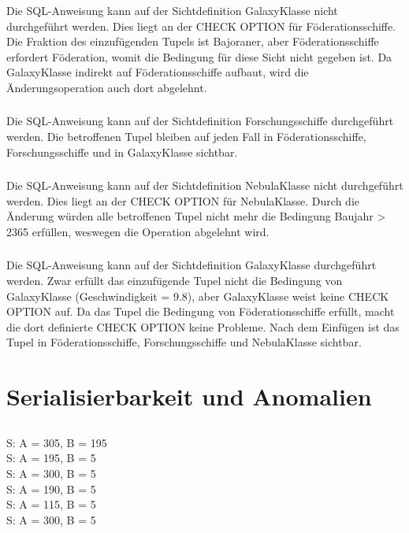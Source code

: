 \documentclass[ngerman]{gdb-aufgabenblatt}
\begin{document}
		\subsubsection{} %
			Die SQL-Anweisung kann auf der Sichtdefinition GalaxyKlasse nicht durchgeführt werden. Dies liegt an der CHECK OPTION für Föderationsschiffe. Die Fraktion des einzufügenden Tupels ist Bajoraner, aber Föderationsschiffe erfordert Föderation, womit die Bedingung für diese Sicht nicht gegeben ist. Da GalaxyKlasse indirekt auf Föderationsschiffe aufbaut, wird die Änderungsoperation auch dort abgelehnt.
		\subsubsection{} %
			Die SQL-Anweisung kann auf der Sichtdefinition Forschungsschiffe durchgeführt werden. Die betroffenen Tupel bleiben auf jeden Fall in Föderationsschiffe, Forschungsschiffe und in GalaxyKlasse sichtbar.
		\subsubsection{} %
			Die SQL-Anweisung kann auf der Sichtdefinition NebulaKlasse nicht durchgeführt werden. Dies liegt an der CHECK OPTION für NebulaKlasse. Durch die Änderung würden alle betroffenen Tupel nicht mehr die Bedingung Baujahr > 2365 erfüllen, weswegen die Operation abgelehnt wird.
		\subsubsection{} %
			Die SQL-Anweisung kann auf der Sichtdefinition GalaxyKlasse durchgeführt werden. Zwar erfüllt das einzufügende Tupel nicht die Bedingung von GalaxyKlasse (Geschwindigkeit = 9.8), aber GalaxyKlasse weist keine CHECK OPTION auf. Da das Tupel die Bedingung von Föderationsschiffe erfüllt, macht die dort definierte CHECK OPTION keine Probleme. Nach dem Einfügen ist das Tupel in Föderationsschiffe, Forschungsschiffe und NebulaKlasse sichtbar.
\section{Serialisierbarkeit und Anomalien}
	\subsection{} %
		S: A = 305, B = 195 \\
		S: A = 195, B = 5 \\
		S: A = 300, B = 5 \\
		S: A = 190, B = 5 \\
		S: A = 115, B = 5 \\
		S: A = 300, B = 5
\end{document}
